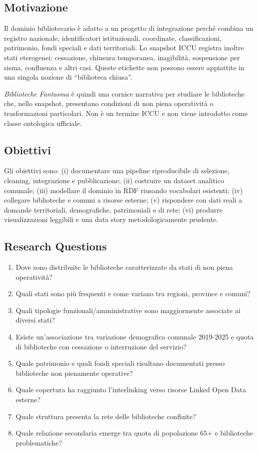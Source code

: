 \documentclass[11pt,a4paper]{article}
\newcommand{\bfproj}{\textit{Biblioteche Fantasma}}
\begin{document}
\subsection{Motivazione}
Il dominio bibliotecario è adatto a un progetto di integrazione perché combina un registro nazionale, identificatori istituzionali, coordinate, classificazioni, patrimonio, fondi speciali e dati territoriali. Lo snapshot ICCU registra inoltre stati eterogenei: cessazione, chiusura temporanea, inagibilità, sospensione per sisma, confluenza e altri casi. Queste etichette non possono essere appiattite in una singola nozione di ``biblioteca chiusa''.

\bfproj{} è quindi una cornice narrativa per studiare le biblioteche che, nello snapshot, presentano condizioni di non piena operatività o trasformazioni particolari. Non è un termine ICCU e non viene introdotto come classe ontologica ufficiale.

\subsection{Obiettivi}
Gli obiettivi sono: (i) documentare una pipeline riproducibile di selezione, cleaning, integrazione e pubblicazione; (ii) costruire un dataset analitico comunale; (iii) modellare il dominio in RDF riusando vocabolari esistenti; (iv) collegare biblioteche e comuni a risorse esterne; (v) rispondere con dati reali a domande territoriali, demografiche, patrimoniali e di rete; (vi) produrre visualizzazioni leggibili e una data story metodologicamente prudente.

\subsection{Research Questions}
\begin{enumerate}[label=RQ\arabic*.]
\item Dove sono distribuite le biblioteche caratterizzate da stati di non piena operatività?
\item Quali stati sono più frequenti e come variano tra regioni, province e comuni?
\item Quali tipologie funzionali/amministrative sono maggiormente associate ai diversi stati?
\item Esiste un'associazione tra variazione demografica comunale 2019-2025 e quota di biblioteche con cessazione o interruzione del servizio?
\item Quale patrimonio e quali fondi speciali risultano documentati presso biblioteche non pienamente operative?
\item Quale copertura ha raggiunto l'interlinking verso risorse Linked Open Data esterne?
\item Quale struttura presenta la rete delle biblioteche confluite?
\item Quale relazione secondaria emerge tra quota di popolazione 65+ e biblioteche problematiche?
\end{enumerate}
\end{document}
